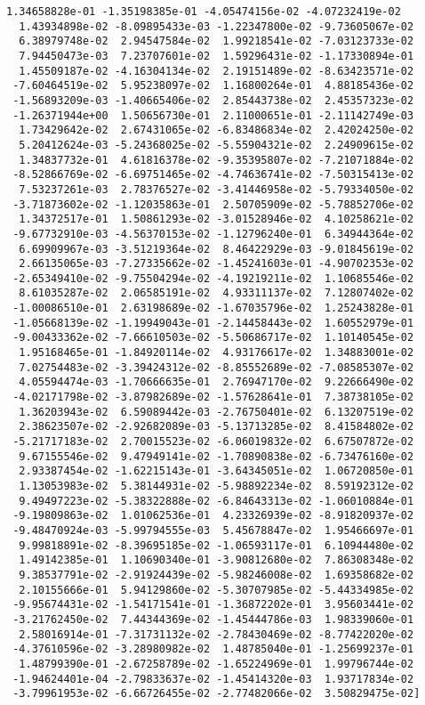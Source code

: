 \documentclass[11pt]{article}
\begin{document}
\begin{Verbatim}[commandchars=\\\{\}]
  1.34658828e-01 -1.35198385e-01 -4.05474156e-02 -4.07232419e-02
  1.43934898e-02 -8.09895433e-03 -1.22347800e-02 -9.73605067e-02
  6.38979748e-02  2.94547584e-02  1.99218541e-02 -7.03123733e-02
  7.94450473e-03  7.23707601e-02  1.59296431e-02 -1.17330894e-01
  1.45509187e-02 -4.16304134e-02  2.19151489e-02 -8.63423571e-02
 -7.60464519e-02  5.95238097e-02  1.16800264e-01  4.88185436e-02
 -1.56893209e-03 -1.40665406e-02  2.85443738e-02  2.45357323e-02
 -1.26371944e+00  1.50656730e-01  2.11000651e-01 -2.11142749e-03
  1.73429642e-02  2.67431065e-02 -6.83486834e-02  2.42024250e-02
  5.20412624e-03 -5.24368025e-02 -5.55904321e-02  2.24909615e-02
  1.34837732e-01  4.61816378e-02 -9.35395807e-02 -7.21071884e-02
 -8.52866769e-02 -6.69751465e-02 -4.74636741e-02 -7.50315413e-02
  7.53237261e-03  2.78376527e-02 -3.41446958e-02 -5.79334050e-02
 -3.71873602e-02 -1.12035863e-01  2.50705909e-02 -5.78852706e-02
  1.34372517e-01  1.50861293e-02 -3.01528946e-02  4.10258621e-02
 -9.67732910e-03 -4.56370153e-02 -1.12796240e-01  6.34944364e-02
  6.69909967e-03 -3.51219364e-02  8.46422929e-03 -9.01845619e-02
  2.66135065e-03 -7.27335662e-02 -1.45241603e-01 -4.90702353e-02
 -2.65349410e-02 -9.75504294e-02 -4.19219211e-02  1.10685546e-02
  8.61035287e-02  2.06585191e-02  4.93311137e-02  7.12807402e-02
 -1.00086510e-01  2.63198689e-02 -1.67035796e-02  1.25243828e-01
 -1.05668139e-02 -1.19949043e-01 -2.14458443e-02  1.60552979e-01
 -9.00433362e-02 -7.66610503e-02 -5.50686717e-02  1.10140545e-02
  1.95168465e-01 -1.84920114e-02  4.93176617e-02  1.34883001e-02
  7.02754483e-02 -3.39424312e-02 -8.85552689e-02 -7.08585307e-02
  4.05594474e-03 -1.70666635e-01  2.76947170e-02  9.22666490e-02
 -4.02171798e-02 -3.87982689e-02 -1.57628641e-01  7.38738105e-02
  1.36203943e-02  6.59089442e-03 -2.76750401e-02  6.13207519e-02
  2.38623507e-02 -2.92682089e-03 -5.13713285e-02  8.41584802e-02
 -5.21717183e-02  2.70015523e-02 -6.06019832e-02  6.67507872e-02
  9.67155546e-02  9.47949141e-02 -1.70890838e-02 -6.73476160e-02
  2.93387454e-02 -1.62215143e-01 -3.64345051e-02  1.06720850e-01
  1.13053983e-02  5.38144931e-02 -5.98892234e-02  8.59192312e-02
  9.49497223e-02 -5.38322888e-02 -6.84643313e-02 -1.06010884e-01
 -9.19809863e-02  1.01062536e-01  4.23326939e-02 -8.91820937e-02
 -9.48470924e-03 -5.99794555e-03  5.45678847e-02  1.95466697e-01
  9.99818891e-02 -8.39695185e-02 -1.06593117e-01  6.10944480e-02
  1.49142385e-01  1.10690340e-01 -3.90812680e-02  7.86308348e-02
  9.38537791e-02 -2.91924439e-02 -5.98246008e-02  1.69358682e-02
  2.10155666e-01  5.94129860e-02 -5.30707985e-02 -5.44334985e-02
 -9.95674431e-02 -1.54171541e-01 -1.36872202e-01  3.95603441e-02
 -3.21762450e-02  7.44344369e-02 -1.45444786e-03  1.98339060e-01
  2.58016914e-01 -7.31731132e-02 -2.78430469e-02 -8.77422020e-02
 -4.37610596e-02 -3.28980982e-02  1.48785040e-01 -1.25699237e-01
  1.48799390e-01 -2.67258789e-02 -1.65224969e-01  1.99796744e-02
 -1.94624401e-04 -2.79833637e-02 -1.45414320e-03  1.93717834e-02
 -3.79961953e-02 -6.66726455e-02 -2.77482066e-02  3.50829475e-02]

    \end{Verbatim}
\end{document}
